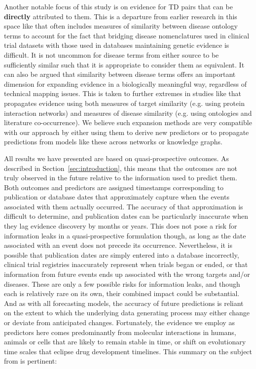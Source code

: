 \documentclass{article}
\begin{document}
Another notable focus of this study is on evidence for TD pairs that can be \textbf{directly} attributed to them. This is a departure from earlier research in this space like \cite{Nelson2015-eg} that often includes measures of similarity between disease ontology terms to account for the fact that bridging disease nomenclatures used in clinical trial datasets with those used in databases maintaining genetic evidence is difficult. It is not uncommon for disease terms from either source to be sufficiently similar such that it is appropriate to consider them as equivalent. It can also be argued that similarity between disease terms offers an important dimension for expanding evidence in a biologically meaningful way, regardless of technical mapping issues. This is taken to further extremes in studies like \cite{PMID:33262371} that propagates evidence using both measures of target similarity (e.g. using protein interaction networks) and measures of disease similarity (e.g. using ontologies and literature co-occurrence). We believe such expansion methods are very compatible with our approach by either using them to derive new predictors or to propagate predictions from models like these across networks or knowledge graphs.

All results we have presented are based on quasi-prospective outcomes. As described in Section~\ref{sec:introduction}, this means that the outcomes are not truly observed in the future relative to the information used to predict them. Both outcomes and predictors are assigned timestamps corresponding to publication or database dates that approximately capture when the events associated with them actually occurred. The accuracy of that approximation is difficult to determine, and publication dates can be particularly inaccurate when they lag evidence discovery by months or years. This does not pose a risk for information leaks in a quasi-prospective formulation though, as long as the date associated with an event does not precede its occurrence. Nevertheless, it is possible that publication dates are simply entered into a database incorrectly, clinical trial registries inaccurately represent when trials began or ended, or that information from future events ends up associated with the wrong targets and/or diseases. These are only a few possible risks for information leaks, and though each is relatively rare on its own, their combined impact could be substantial. And as with all forecasting models, the accuracy of future predictions is reliant on the extent to which the underlying data generating process may either change or deviate from anticipated changes. Fortunately, the evidence we employ as predictors here comes predominantly from molecular interactions in humans, animals or cells that are likely to remain stable in time, or shift on evolutionary time scales that eclipse drug development timelines. This summary on the subject from \cite{PMID:33262371} is pertinent:
\end{document}
